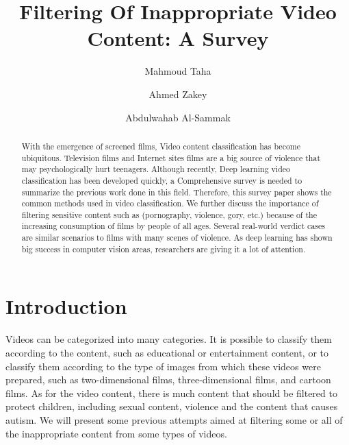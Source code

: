 \documentclass[runningheads]{llncs}
\begin{document}
\title{Filtering Of Inappropriate Video Content: A Survey}

\author{
Mahmoud Taha
\and
Ahmed Zakey
\and
Abdulwahab Al-Sammak
} 



\maketitle %

\begin{abstract}

With the emergence of screened films, Video content classification has become ubiquitous. Television films and Internet sites films are a big source of violence that may psychologically hurt teenagers. Although recently, Deep learning video classification has been developed quickly, a Comprehensive survey is needed to summarize the previous work done in this field. Therefore, this survey paper shows the common methods used in video classification. We further discuss the importance of filtering sensitive content such as (pornography, violence, gory, etc.) because of the increasing consumption of films by people of all ages. Several real-world verdict cases are similar scenarios to films with many scenes of violence. As deep learning has shown big success in computer vision areas, researchers are giving it a lot of attention.


\end{abstract}
\section{Introduction}

 Videos can be categorized into many categories. It is possible to classify them according to the content, such as educational or entertainment content, or to classify them according to the type of images from which these videos were prepared, such as two-dimensional films, three-dimensional films, and cartoon films. As for the video content, there is much content that should be filtered to protect children, including sexual content, violence and the content that causes autism. We will present some previous attempts aimed at filtering some or all of the inappropriate content from some types of videos.\\
 
\end{document}
